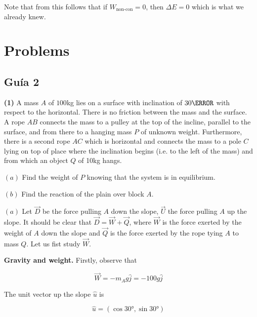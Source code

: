 \documentclass[12pt]{article}
\theoremstyle{definition}
\begin{document}
Note that from this follows that if $W_{\text{non-con}} = 0$, then $\Delta E =
0$ which is what we already knew.





\pagebreak 

\section{Problems}

\subsection{Guía 2}

\begin{shaded}
    \textbf{(1)} A mass $A$ of $100$kg lies on a surface with inclination of
    $30\degree$ with respect to the horizontal. There is no friction between the
    mass and the surface. A rope $AB$ connects the mass to a pulley at the top
    of the incline, parallel to the surface, and from there to a hanging mass
    $P$ of unknown weight. Furthermore, there is a second rope $AC$ which is 
    horizontal and connects the mass to a pole $C$ lying on top of place where
    the inclination begins (i.e. to the left of the mass) and from which an
    object $Q$ of 10kg hangs.  

    $(a)$ Find the weight of $P$ knowing that the system is in equilibrium.

    $(b)$ Find the reaction of the plain over block $A$.
\end{shaded}

$(a)$ Let $\vec{D}$ be the force pulling $A$ down the slope, $\vec{U}$ the force pulling $A$
up the slope. It should be clear that $\vec{D} = \vec{W} + \vec{Q}$, where
$\vec{W}$ is the force exerted by the weight of $A$ down the slope and $\vec{Q}$
is the force exerted by the rope tying $A$ to mass $Q$. Let us fist study
$\vec{W}$.

\textbf{Gravity and weight.} Firstly, observe that 

\begin{equation}
    \vec{W} = -m_A g \hat{j} = -100g \hat{j}
\end{equation}

The unit vector up the slope $\hat{u}$ is

\begin{equation}
    \hat{u} = (\cos \ang{30}, \sin \ang{30})
\end{equation}
\end{document}
